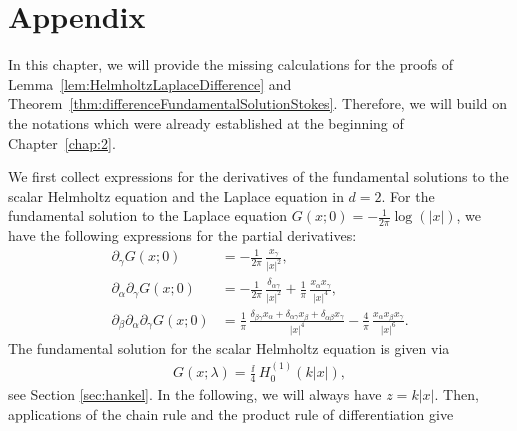 \chapter*{Appendix}
\label{chap:app}

In this chapter, we will provide the missing calculations for the proofs of Lemma~\ref{lem:HelmholtzLaplaceDifference} and Theorem~\ref{thm:differenceFundamentalSolutionStokes}.
Therefore, we will build on the notations which were already established at the beginning of Chapter~\ref{chap:2}.

We first collect expressions for the derivatives of the fundamental solutions to the scalar Helmholtz equation and the Laplace equation in $d= 2$.
For the fundamental solution to the Laplace equation $G(x; 0) = -\frac{1}{2\pi} \log(|x|)$, we have the following expressions for the partial derivatives:
\begin{align*}
  \partial_\gamma G(x; 0) &= -\frac{1}{2\pi} \, \frac{x_\gamma}{|x|^2}, \\[0.5em]
  \partial_\alpha \partial_\gamma G(x; 0) &= -\frac{1}{2\pi}\, \frac{\delta_{\alpha\gamma}}{|x|^2} + \frac{1}{\pi} \, \frac{x_\alpha x_\gamma}{|x|^4}, \\[0.5em]
  \partial_\beta \partial_\alpha \partial_\gamma G(x; 0)
  &= \frac{1}{\pi} \, \frac{\delta_{\beta \gamma} x_\alpha + \delta_{\alpha \gamma} x_\beta + \delta_{\alpha\beta} x_\gamma}{|x|^4} - \frac{4}{\pi}\, \frac{x_\alpha x_\beta x_\gamma}{|x|^6}.
\end{align*}
The fundamental solution for the scalar Helmholtz equation is given via 
\begin{align*}
  G(x; \lambda) = \frac{\ii}{4}\, H_0^{(1)}(k|x|),
\end{align*}
see Section \ref{sec:hankel}.
In the following, we will always have $z =  k|x|$.  
Then, applications of the chain rule and the product rule of differentiation give
